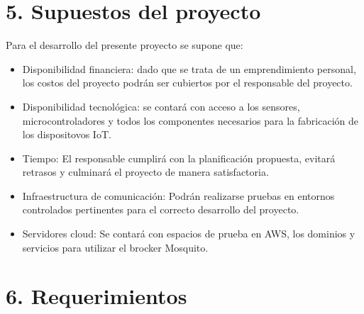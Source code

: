 \documentclass[
11pt, %
]{charter}
\begin{document}
\section{5. Supuestos del proyecto}
\label{sec:supuestos}

Para el desarrollo del presente proyecto se supone que:

\begin{itemize}
	\item Disponibilidad financiera: dado que se trata de un emprendimiento personal, los costos del proyecto podrán ser cubiertos por el responsable del proyecto.
	\item Disponibilidad tecnológica: se contará con acceso a los sensores, microcontroladores y todos los componentes necesarios para la fabricación de los dispositovos IoT.
	\item Tiempo: El responsable cumplirá con la planificación propuesta, evitará retrasos y culminará el proyecto de manera satisfactoria.
	\item Infraestructura de comunicación: Podrán realizarse pruebas en entornos controlados pertinentes para el correcto desarrollo del proyecto.
	\item Servidores cloud: Se contará con espacios de prueba en AWS, los dominios y servicios para utilizar el brocker Mosquito.

\end{itemize}

\section{6. Requerimientos}
\label{sec:requerimientos}
\end{document}
